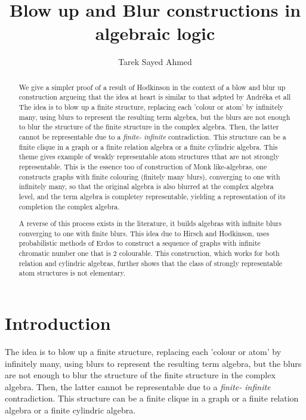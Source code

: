 \documentclass[12pt]{article}
\title{Blow up and Blur constructions in algebraic logic}
\author{Tarek Sayed Ahmed}
\theoremstyle{definition}
\begin{document}
\maketitle

\begin{abstract} We give a simpler proof of a result of Hodkinson in the context of a blow and blur up construction
argueing that the idea at heart is similar to that adpted by Andr\'eka et all \cite{sayed}
The idea is to blow up a finite structure, replacing each 'colour or atom' by infinitely many, using blurs
to  represent the resulting term algebra, but the blurs are not enough to blur the structure of the finite structure in the complex algebra. 
Then, the latter cannot be representable due to a {\it finite- infinite} contradiction. 
This structure can be a finite clique in a graph or a finite relation algebra or a finite 
cylindric algebra. This theme gives example of weakly representable atom structures tthat are not strongly
representable. This is the essence too of construction of Monk like-algebras, one constructs graphs with finite colouring (finitely many blurs),
converging to one with infinitely many, so that the original algebra is also blurred at the complex algebra level, 
and the term algebra is completey representable, yielding a representation of its completion the 
complex algebra. 

A reverse of this process exists in the literature, it builds algebras with infinite blurs converging to one with finite blurs. This idea due to 
Hirsch and Hodkinson, uses probabilistic methods of Erdos to construct a  sequence of graphs with infinite  chromatic 
number one that is $2$ colourable. This construction, which works for both relation and cylindric algebras,
further shows that the class of strongly representable atom structures
is not elementary.
\end{abstract}


\section{Introduction}

The idea is to blow up a finite structure, replacing each 'colour or atom' by infinitely many, using blurs
to  represent the resulting term algebra, but the blurs are not enough to blur the structure of the finite structure in the complex algebra. 
Then, the latter cannot be representable due to a {\it finite- infinite} contradiction. 
This structure can be a finite clique in a graph or a finite relation algebra or a finite 
cylindric algebra.
\end{document}
